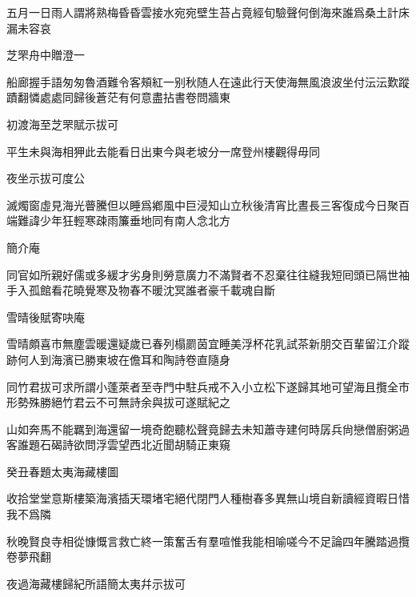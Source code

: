\documentclass{zhvt-classic-Miya}
\begin{document}
五月一日雨人謂將熟梅昏昏雲接水宛宛壁生苔占竟經旬驗聲何倒海來誰爲桑土計床漏未容哀

\begin{fw}芝罘舟中贈澄一\end{fw}

船廊握手語匆匆魯酒難令客頰紅一别秋随人在遠此行天使海無風浪波坐付沄沄歎蹤蹟翻憐處處同歸後蒼茫有何意盡拈書卷問牆東

\begin{fw}初渡海至芝罘賦示拔可\end{fw}

平生未與海相狎此去能看日出東今與老坡分一席登州樓觀得毋同

\begin{fw}夜坐示拔可度公\end{fw}

滅燭窗虛見海光瞢騰但以睡爲鄕風中巨浸知山立秋後清宵比晝長三客復成今日聚百端難諱少年狂輕寒疎雨簾垂地同有南人念北方

\begin{fw}簡介庵\end{fw}

同官如所親好儒或多緩才劣身則勞意廣力不滿賢者不忍棄往往縫我短囘頭已隔世袖手入孤館看花曉覺寒及物春不暖沈冥誰者豪千載魂自斷

\begin{fw}雪晴後賦寄吷庵\end{fw}

雪晴頗喜市無塵雲暖還疑歲已春列榻罽茵宜睡美浮杯花乳試茶新朋交百輩留江介蹤跡何人到海濱已勝東坡在儋耳和陶詩卷直隨身

\begin{fw}同竹君拔可求所謂小蓬萊者至寺門中駐兵戒不入小立松下遂歸其地可望海且攬全市形勢殊勝絕竹君云不可無詩余與拔可遂賦紀之\end{fw}

山如奔馬不能羈到海還留一境奇飽聽松聲竟歸去未知蕭寺建何時孱兵尙戀僧廚粥過客誰題石碣詩欲問浮雲望西北近聞胡騎正東窺

\begin{fw}癸丑春題太夷海藏樓圖\end{fw}

收拾堂堂意斯樓築海濱插天環堵宅絕代閉門人種樹春多異無山境自新讀經資暇日惜我不爲隣

秋晚賢良寺相從慷慨言救亡終一策奮舌有羣喧惟我能相喻嗟今不足論四年騰踏過攬卷夢飛翻

\begin{fw}夜過海藏樓歸紀所語簡太夷幷示拔可\end{fw}
\end{document}
